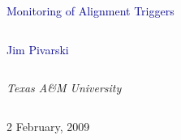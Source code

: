 \documentclass[compress]{beamer}
\begin{document}
\begin{frame}
\vfill
\begin{center}
\textcolor{darkblue}{\Large Monitoring of Alignment Triggers}

\vfill
\begin{columns}
\begin{center}
\large
\textcolor{darkblue}{Jim Pivarski}
\end{center}
\end{columns}

\begin{columns}
\begin{center}
\scriptsize
{\it Texas A\&M University}
\end{center}
\end{columns}

\vfill
 2 February, 2009

\end{center}
\end{frame}


\small
\end{document}
